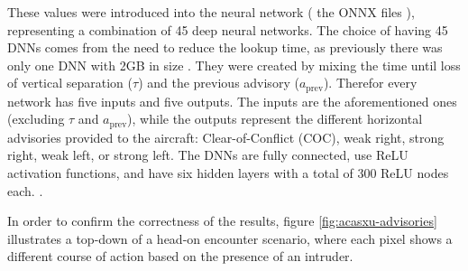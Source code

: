 These values were introduced into the neural network ( the ONNX files ), representing a combination of 45 deep neural networks. The choice of having 45 DNNs comes from the need to reduce the lookup time, as previously there was only one DNN with 2GB in size \cite{katz2017reluplex}. They were created by mixing the time until loss of vertical separation (\(\tau\)) and the previous advisory (\(a_{\text{prev}}\)). Therefor every network has five inputs and five outputs. The inputs are the aforementioned ones (excluding \(\tau\) and \(a_{\text{prev}}\)), while the outputs represent the different horizontal advisories provided to the aircraft: Clear-of-Conflict (COC), weak right, strong right, weak left, or strong left. The DNNs are fully connected, use ReLU activation functions, and have six hidden layers with a total of 300 ReLU nodes each. \cite{katz2017reluplex}.

In order to confirm the correctness of the results, figure \ref{fig:acasxu-advisories} illustrates a top-down of a head-on encounter scenario, where each pixel shows a different course of action based on the presence of an intruder.

